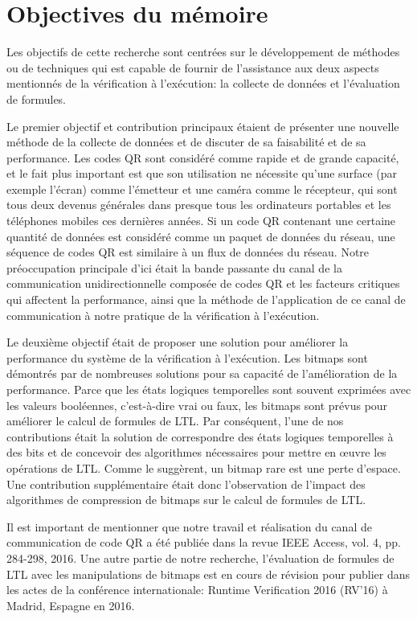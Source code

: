 \section{Objectives du mémoire}

Les objectifs de cette recherche sont centrées sur le développement de méthodes ou de techniques qui est capable de fournir de l'assistance aux deux aspects mentionnés de la vérification à l'exécution: la collecte de données et l'évaluation de formules.

Le premier objectif et contribution principaux étaient de présenter une nouvelle méthode de la collecte de données et de discuter de sa faisabilité et de sa performance. Les codes QR sont considéré comme rapide et de grande capacité, et le fait plus important est que son utilisation ne nécessite qu'une surface (par exemple l'écran) comme l'émetteur et une caméra comme le récepteur, qui sont tous deux  devenus générales dans presque tous les ordinateurs portables et les téléphones mobiles ces dernières années. Si un code QR contenant une certaine quantité de données est considéré comme un paquet de données du réseau, une séquence de codes QR est similaire à un flux de données du réseau. Notre préoccupation principale d'ici était la bande passante du canal de la communication unidirectionnelle composée de codes QR et les facteurs critiques qui affectent la performance, ainsi que la méthode de l'application de ce canal de communication à notre pratique de la vérification à l'exécution.

Le deuxième objectif était de proposer une solution pour améliorer la performance du système de la vérification à l'exécution. Les bitmaps sont démontrés par de nombreuses solutions pour sa capacité de l'amélioration de la performance. Parce que les états logiques temporelles sont souvent exprimées avec les valeurs booléennes, c'est-à-dire vrai ou faux, les bitmaps sont prévus pour améliorer le calcul de formules de LTL. Par conséquent, l'une de nos contributions était la solution de correspondre des états logiques temporelles à des bits et de concevoir des algorithmes nécessaires pour mettre en œuvre les opérations de LTL. Comme \cite{lemire2014} le suggèrent, un bitmap rare est une perte d'espace. Une contribution supplémentaire était donc l'observation de l'impact des algorithmes de compression de bitmaps sur le calcul de formules de LTL.

Il est important de mentionner que notre travail et réalisation du canal de communication de code QR a été publiée dans la revue IEEE Access, vol. 4, pp. 284-298, 2016. Une autre partie de notre recherche, l'évaluation de formules de LTL avec les manipulations de bitmaps est en cours de révision pour publier dans les actes de la conférence internationale: Runtime Verification 2016 (RV'16) à Madrid, Espagne en 2016.

